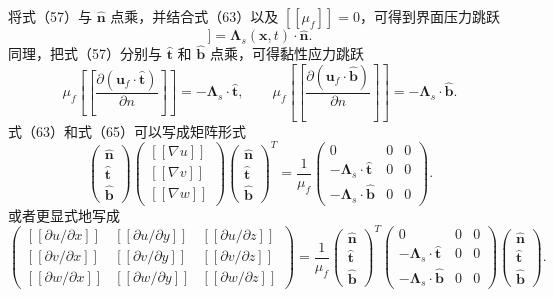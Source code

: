 \documentclass[UTF8,11pt,a4paper]{ctexart}
\newcommand{\jump}[1]{[\![#1]\!]}
\begin{document}
将式（57）与 $\hat{\bm n}$ 点乘，并结合式（63）以及 $\jump{\mu_f}=0$，可得到界面压力跳跃
\begin{equation}
\jump{p_f(\bm x,t)}=\bm\Lambda_s(\bm x,t)\cdot\hat{\bm n}. \tag{64}
\end{equation}
同理，把式（57）分别与 $\hat{\bm t}$ 和 $\hat{\bm b}$ 点乘，可得黏性应力跳跃
\begin{equation}
\mu_f\jump{\frac{\partial(\bm u_f\cdot\hat{\bm t})}{\partial n}}
=-\bm\Lambda_s\cdot\hat{\bm t},
\qquad
\mu_f\jump{\frac{\partial(\bm u_f\cdot\hat{\bm b})}{\partial n}}
=-\bm\Lambda_s\cdot\hat{\bm b}. \tag{65}
\end{equation}
式（63）和式（65）可以写成矩阵形式
\begin{equation}
\begin{pmatrix}
\hat{\bm n}\\[0.1em]\hat{\bm t}\\[0.1em]\hat{\bm b}
\end{pmatrix}
\begin{pmatrix}
\jump{\nabla u}\\[0.1em]\jump{\nabla v}\\[0.1em]\jump{\nabla w}
\end{pmatrix}
\begin{pmatrix}
\hat{\bm n}\\[0.1em]\hat{\bm t}\\[0.1em]\hat{\bm b}
\end{pmatrix}^{T}
=\frac{1}{\mu_f}
\begin{pmatrix}
0&0&0\\
-\bm\Lambda_s\cdot\hat{\bm t}&0&0\\
-\bm\Lambda_s\cdot\hat{\bm b}&0&0
\end{pmatrix}. \tag{66}
\end{equation}
或者更显式地写成
\begin{equation}
\begin{pmatrix}
\jump{\partial u/\partial x}&\jump{\partial u/\partial y}&\jump{\partial u/\partial z}\\
\jump{\partial v/\partial x}&\jump{\partial v/\partial y}&\jump{\partial v/\partial z}\\
\jump{\partial w/\partial x}&\jump{\partial w/\partial y}&\jump{\partial w/\partial z}
\end{pmatrix}
=\frac{1}{\mu_f}
\begin{pmatrix}\hat{\bm n}\\\hat{\bm t}\\\hat{\bm b}\end{pmatrix}^{T}
\begin{pmatrix}
0&0&0\\
-\bm\Lambda_s\cdot\hat{\bm t}&0&0\\
-\bm\Lambda_s\cdot\hat{\bm b}&0&0
\end{pmatrix}
\begin{pmatrix}\hat{\bm n}\\\hat{\bm t}\\\hat{\bm b}\end{pmatrix}. \tag{67}
\end{equation}
\end{document}
